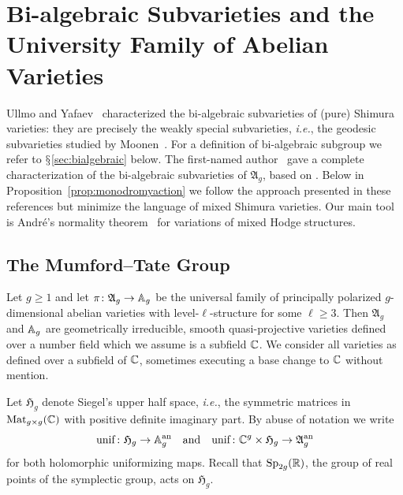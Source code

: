 \documentclass[12pt,oneside]{amsart}
\begin{document}
\section{Bi-algebraic Subvarieties and the University Family of Abelian Varieties}

Ullmo and Yafaev~\cite{UYweaklyspecial} characterized the bi-algebraic
subvarieties of (pure) Shimura varieties: they are precisely the
weakly special subvarieties, \textit{i.e.}, the geodesic subvarieties
studied by Moonen~\cite{Moonen}.
For a definition of bi-algebraic subgroup we refer to
$\mathsection$\ref{sec:bialgebraic} below.
The first-named
author~\cite[$\mathsection$3]{Gao:SNS17} gave a complete
characterization of the bi-algebraic subvarieties of $\mathfrak{A}_g$,
based on \cite[$\mathsection$8]{GaoCrelle}. Below in
Proposition~\ref{prop:monodromyaction} we follow the approach
presented in these references but minimize the language of mixed
Shimura varieties. Our main tool is Andr\'e's normality
theorem~\cite{Andre92} for variations of mixed Hodge structures.

\subsection{The Mumford--Tate Group}
\label{sec:MT}

Let $g\ge 1$ and let $\pi\colon \mathfrak{A}_g\rightarrow{\mathbb{A}}_g$ be the
universal family of principally polarized $g$-dimensional abelian
varieties with level-$\ell$-structure for some $\ell\ge 3$. Then
$\mathfrak{A}_g$ and ${\mathbb{A}}_g$ are geometrically irreducible, smooth
quasi-projective varieties defined over a number field which we assume
is a subfield ${\mathbb{C}}$. We consider all varieties as defined over a
subfield of ${\mathbb{C}}$, sometimes executing a base change to ${\mathbb{C}}$ without
mention.

Let $\mathfrak{H}_g$ denote Siegel's upper half space, \textit{i.e.}, the
symmetric matrices in $\mathrm{Mat}_{g\times g}({\mathbb{C}})$ with positive definite
imaginary part. 
By abuse of notation we write
\begin{equation*}
  \mathrm{unif}\colon \mathfrak{H}_g
  \rightarrow{\mathbb{A}}_g^{\mathrm{an}}\quad\text{and}\quad
  \mathrm{unif}\colon {\mathbb{C}}^g\times \mathfrak{H}_g\rightarrow\mathfrak{A}_g^{\mathrm{an}}
\end{equation*}
for both holomorphic uniformizing maps.
Recall that $\mathrm{Sp}_{2g}({\mathbb{R}})$, the group of real points of the
symplectic group,
acts on $\mathfrak{H}_g$. 
\end{document}
